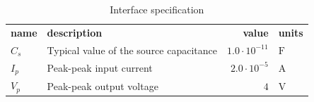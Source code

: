 \begin{table}[h]
\centering
\begin{tabular}[c]{llrl}
\textbf{name} & \textbf{description} & \textbf{value} & \textbf{units} \\ 
\rowcolor{myyellow}
$C_{s}$ &\small{Typical value of the source capacitance} &$1.0 \cdot 10^{-11}$ &$\mathrm{ F}$ \\ 
$I_{p}$ &\small{Peak-peak input current} &$2.0 \cdot 10^{-5}$ &$\mathrm{ A}$ \\ 
\rowcolor{myyellow}
$V_{p}$ &\small{Peak-peak output voltage} &$4$ &$\mathrm{ V}$ \\ 
\end{tabular}
\caption{Interface specification}
\end{table}


